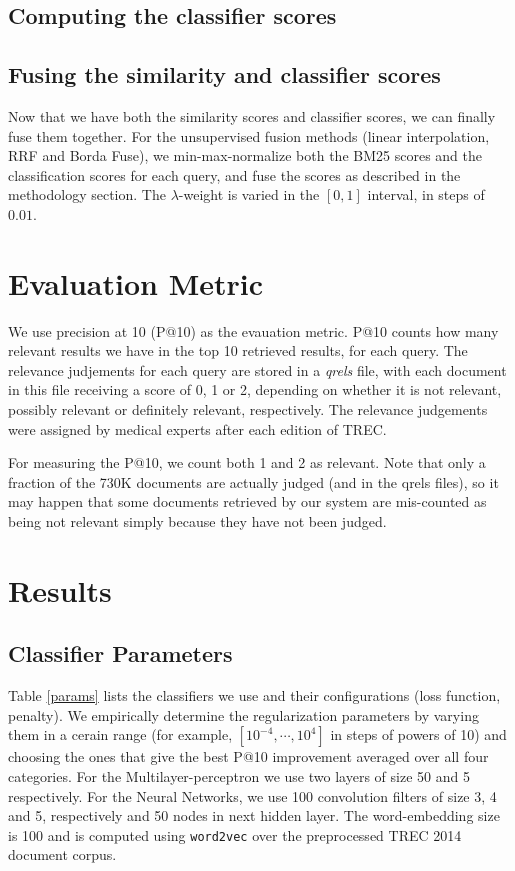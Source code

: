 \subsection{Computing the classifier scores}


\subsection{Fusing the similarity and classifier scores}
Now that we have both the similarity scores and classifier scores, we can finally fuse them together. 
For the unsupervised fusion methods (linear interpolation, RRF and Borda Fuse), we min-max-normalize both the BM25 scores
and the classification scores for each query, and fuse the scores as described in the methodology section. The $\lambda$-weight
is varied in the $[0,1]$ interval, in steps of $0.01$.


\section{Evaluation Metric}
We use precision at 10 (P@10) as the evauation metric. P@10 counts how many relevant results we have in the top 10 retrieved results, for each query.
The relevance judjements for each query are stored in a \emph{qrels} file, with each document in this file receiving a score of 0, 1 or 2, depending on whether it
is not relevant, possibly relevant or definitely relevant, respectively. The relevance judgements were assigned by medical experts after each edition of TREC.

For measuring the P@10, we count both 1 and 2 as relevant. Note that only a
fraction of the 730K documents are actually judged (and in the qrels files), so it may happen that some documents retrieved by our system
are mis-counted as being not relevant simply because they have not been judged.


\section{Results}
\subsection{Classifier Parameters}
Table \ref{params} lists the classifiers we use and their configurations (loss function, penalty). We empirically determine
the regularization
parameters by varying them in a cerain range (for example, $[10^{-4},\cdots,10^4]$ in steps of powers of 10) and choosing the ones
that give the
best P@10 improvement averaged over all four categories.
For the Multilayer-perceptron we use two layers of size 50 and 5 respectively. For the Neural Networks,
we use 100 convolution filters of size 3, 4 and 5, respectively and 50 nodes in next hidden layer. The word-embedding size is 100 
and is computed using \texttt{word2vec} over the preprocessed TREC 2014 document corpus.


